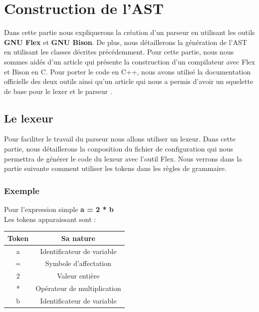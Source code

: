 \documentclass[a4paper]{article}%
\begin{document}
\clearpage{}

\section{Construction de l'AST}

Dans cette partie nous expliquerons la création d'un parseur en utilisant les
outils \textbf{GNU Flex} et \textbf{GNU Bison}. De plus, nous détaillerons la
génération de l'AST en utilisant les classes décrites précédemment. Pour cette
partie, nous nous sommes aidés d'un article \cite{compilerFlexBison} qui
présente la construction d'un compilateur avec Flex et Bison en C. Pour porter
le code en C++, nous avons utilisé la documentation officielle des deux outils
ainsi qu'un article qui nous a permis d'avoir un squelette de base pour le
\gls{lexer} et le parseur \cite{cppparsing}.

\subsection{Le lexeur}

Pour faciliter le travail du parseur nous allons utiliser un lexeur. Dans
cette partie, nous détaillerons la conposition du fichier de configuration qui
nous permettra de générer le code du lexeur avec l'outil Flex. Nous verrons dans
la partie suivante comment utiliser les tokens dans les règles de grammaire.

\subsubsection*{Exemple}

Pour l'expression simple \textbf{a = 2 * b} \\
Les tokens apparaissant sont : \\
\begin{center}
  \begin{tabular}{ | c | c | }
    \hline
    \textbf{Token} & \textbf{Sa nature} \\
    \hline
    a & Identificateur de variable \\
    \hline
    = & Symbole d'affectation \\
    \hline
    2 & Valeur entière \\
    \hline
    * & Opérateur de multiplication \\
    \hline
    b & Identificateur de variable \\
    \hline
  \end{tabular}
\end{center}
\end{document}
